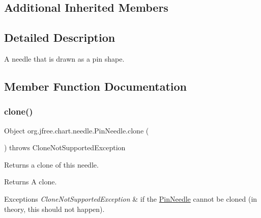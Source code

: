 \subsection*{Additional Inherited Members}


\subsection{Detailed Description}
A needle that is drawn as a pin shape. 

\subsection{Member Function Documentation}
\mbox{\label{classorg_1_1jfree_1_1chart_1_1needle_1_1_pin_needle_aeccbee91065e41ea04c45d391d15ec35}} 
\subsubsection{\texorpdfstring{clone()}{clone()}}
{\footnotesize\ttfamily Object org.\+jfree.\+chart.\+needle.\+Pin\+Needle.\+clone (\begin{DoxyParamCaption}{ }\end{DoxyParamCaption}) throws Clone\+Not\+Supported\+Exception}

Returns a clone of this needle.

\begin{DoxyReturn}{Returns}
A clone.
\end{DoxyReturn}

\begin{DoxyExceptions}{Exceptions}
{\em Clone\+Not\+Supported\+Exception} & if the {\ttfamily \mbox{\hyperlink{classorg_1_1jfree_1_1chart_1_1needle_1_1_pin_needle}{Pin\+Needle}}} cannot be cloned (in theory, this should not happen). \\
\hline
\end{DoxyExceptions}
\mbox{\label{classorg_1_1jfree_1_1chart_1_1needle_1_1_pin_needle_ab8a0ec301185b84573d54119f8877eb8}} 
